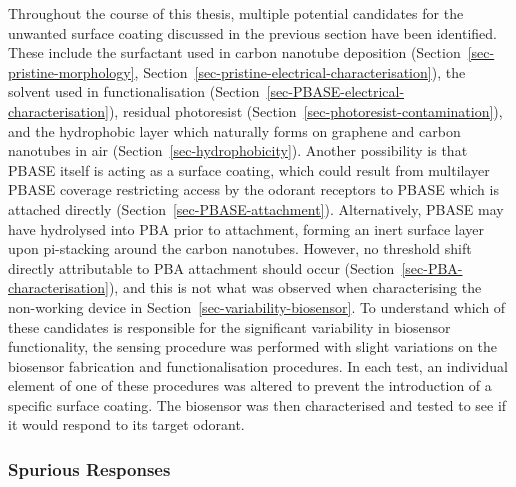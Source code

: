 \documentclass[
  a4paper,
]{scrbook}
\begin{document}
Throughout the course of this thesis, multiple potential candidates for
the unwanted surface coating discussed in the previous section have been
identified. These include the surfactant used in carbon nanotube
deposition (Section~\ref{sec-pristine-morphology},
Section~\ref{sec-pristine-electrical-characterisation}), the solvent
used in functionalisation
(Section~\ref{sec-PBASE-electrical-characterisation}), residual
photoresist (Section~\ref{sec-photoresist-contamination}), and the
hydrophobic layer which naturally forms on graphene and carbon nanotubes
in air (Section~\ref{sec-hydrophobicity}). Another possibility is that
PBASE itself is acting as a surface coating, which could result from
multilayer PBASE coverage restricting access by the odorant receptors to
PBASE which is attached directly (Section~\ref{sec-PBASE-attachment}).
Alternatively, PBASE may have hydrolysed into PBA prior to attachment,
forming an inert surface layer upon pi-stacking around the carbon
nanotubes. However, no threshold shift directly attributable to PBA
attachment should occur (Section~\ref{sec-PBA-characterisation}), and
this is not what was observed when characterising the non-working device
in Section~\ref{sec-variability-biosensor}. To understand which of these
candidates is responsible for the significant variability in biosensor
functionality, the sensing procedure was performed with slight
variations on the biosensor fabrication and functionalisation
procedures. In each test, an individual element of one of these
procedures was altered to prevent the introduction of a specific surface
coating. The biosensor was then characterised and tested to see if it
would respond to its target odorant.

\hypertarget{spurious-responses}{%
\subsubsection*{Spurious Responses}\label{spurious-responses}}
\end{document}
